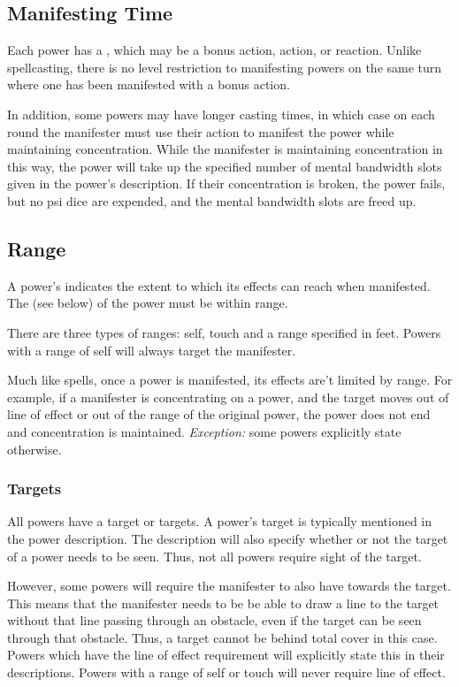 \subsection{Manifesting Time}
Each power has a ,
which may be a bonus action, action, or reaction.
Unlike spellcasting,
there is no level restriction to manifesting powers
on the same turn where one has been manifested
with a bonus action. 

In addition, some powers may have longer casting times,
in which case on each round the manifester must use their action
to manifest the power while maintaining concentration.
While the manifester is maintaining concentration in this way,
the power will take up the specified number
of mental bandwidth slots given in the power's description.
If their concentration is broken, the power fails,
but no psi dice are expended,
and the mental bandwidth slots are freed up.

\subsection{Range}
A power's  indicates the extent
to which its effects can reach when manifested.
The  (see below) of the power must be within range.

There are three types of ranges: self, touch and a range
specified in feet.
Powers with a range of self will always target the manifester.

Much like spells,
once a power is manifested,
its effects are't limited by range.
For example,
if a manifester is concentrating on a power,
and the target moves out of line of effect or out of
the range of the original power,
the power does not end and concentration is maintained.
\textit{Exception:} some powers explicitly state otherwise.

\subsubsection{Targets}
All powers have a target or targets.
A power's target is typically mentioned in the power description.
The description will also specify whether or not the target
of a power needs to be seen.
Thus, not all powers require sight of the target.

However, some powers will
require the manifester to also have 
towards the target.
This means that the manifester needs to be be able to draw a line
to the target without that line passing through an obstacle,
even if the target can be seen through that obstacle.
Thus, a target cannot be behind total cover in this case.
Powers which have the line of effect requirement
will explicitly state this in their descriptions.
Powers with a range of self or touch
will never require line of effect.

